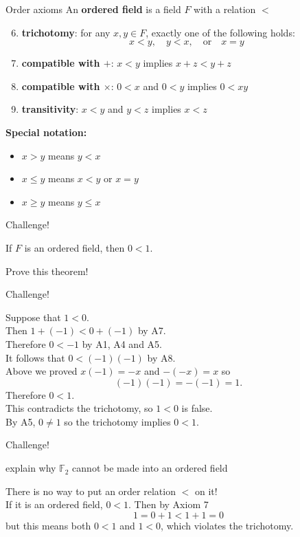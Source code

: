 \documentclass{beamer}
\begin{document}
\begin{frame}{Order axioms}
An \textbf{ordered field} is a field $F$ with a relation $<$ 
\begin{enumerate}[\text{A}1]
\setcounter{enumi}{5}
\pause
\item \textbf{trichotomy}: for any $x,y\in F$, exactly one of the following holds:
$$x < y,\quad y < x,\quad\text{or}\quad x = y$$
\pause
\item \textbf{compatible with $+$}: $x < y$ implies $x+z < y+z$
\pause
\item \textbf{compatible with $\times$}: $0 < x$ and $0 < y$ implies $0 < xy$
\pause
\item \textbf{transitivity}: $x < y$ and $y < z$ implies $x < z$
\end{enumerate}
\pause
\textbf{Special notation:}
\begin{itemize}
\item $x > y$ means $y < x$
\item $x \leq y$ means $x < y$ or $x=y$
\item $x \geq y$ means $y \leq x$
\end{itemize}
\end{frame}

\begin{frame}{Challenge!}
\begin{thm}
If $F$ is an ordered field, then $0<1$.
\end{thm}
\pause
\begin{prob}
Prove this theorem!
\end{prob}
\end{frame}

\begin{frame}{Challenge!}
\begin{soln}
Suppose that $1 < 0$.\\
\pause
Then $1+(-1) < 0 + (-1)$ by A7.\\
\pause
Therefore $0 < -1$ by A1, A4 and A5.\\
\pause
It follows that $0 < (-1)(-1)$ by A8.\\
\pause
Above we proved $x(-1) = -x$ and $-(-x) = x$ so
$$(-1)(-1) = -(-1) = 1.$$
\pause
Therefore $0<1$.\\
\pause
This contradicts the trichotomy, so $1 < 0$ is false.\\
\pause
By A5, $0\neq 1$ so the trichotomy implies $0<1$.
\end{soln}
\end{frame}

\begin{frame}{Challenge!}
\begin{prob}
explain why $\mathbb{F}_2$ cannot be made into an ordered field
\end{prob}
\pause
\begin{soln}
There is no way to put an order relation $<$ on it!\\
\pause
If it is an ordered field, $0 < 1$.
\pause
Then by Axiom 7
$$1 = 0+1 < 1+1 = 0$$
but this means both $0 < 1$ and $1 < 0$, which violates the trichotomy.
\end{soln}
\end{frame}
\end{document}
